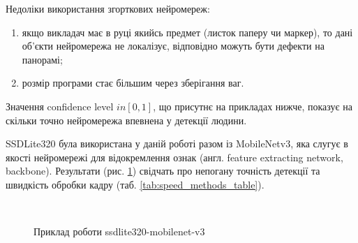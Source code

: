 Недоліки використання згорткових нейромереж:
\begin{enumerate}
    \item якщо викладач має в руці якийсь предмет (листок паперу чи маркер), то дані
          об'єкти нейромережа не локалізує, відповідно можуть бути дефекти на панорамі;
    \item розмір програми стає більшим через зберігання ваг.
\end{enumerate}

Значення confidence level $in [0,1]$, що присутнє на прикладах нижче, показує на скільки точно нейромережа
впевнена у детекції людини.

SSDLite320 була використана у даній роботі разом із MobileNetv3, яка слугує в якості нейромережі для
відокремлення ознак  (англ. feature extracting network, backbone). Результати
(рис. \ref{fig:ssdlite320_mobilenet-v3_examples}) свідчать про
непогану точність детекції та швидкість обробки кадру (таб. \ref{tab:speed_methods_table}).

\begin{figure}[H]
    \centering
     \\
    \caption{Приклад роботи ssdlite320-mobilenet-v3
        \label{fig:ssdlite320_mobilenet-v3_examples}
    }
\end{figure}


